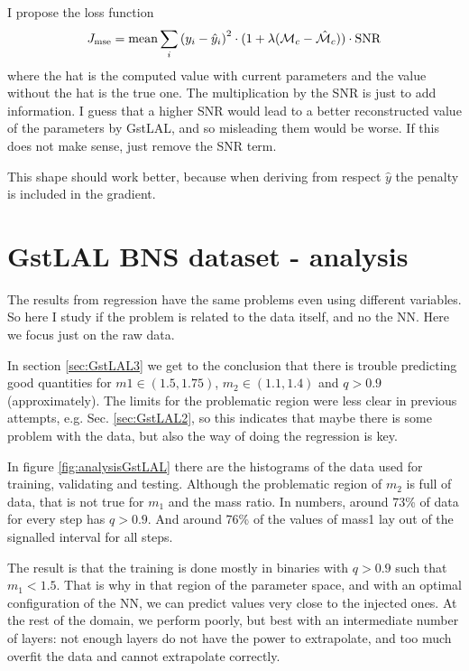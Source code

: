 \documentclass[prd,aps,twocolumn,a4paper,showkeys,nofootinbib]{article}
\begin{document}
I propose the loss function 
\begin{equation}
J_{\rm mse} = {\rm mean} \sum_i \left( y_i - \hat{y}_i \right)^2 \cdot(1+\lambda(\mathcal{M}_c-\hat{\mathcal{M}}_c))\cdot \rm{SNR}
\end{equation}
where the hat is the computed value with current parameters and the value without the hat is the true one. The multiplication by the SNR is just to add information. I guess that a higher SNR would lead to a better reconstructed value of the parameters by GstLAL, and so misleading them would be worse. If this does not make sense, just remove the SNR term.

This shape should work better, because when deriving from respect $\hat{y}$ the penalty is included in the gradient.



\section{GstLAL BNS dataset - analysis}
\label{sec:GstLALanalysis}
The results from regression have the same problems even using different variables. So here I study if the problem is related to the data itself, and no the NN. Here we focus just on the raw data.

In section \ref{sec:GstLAL3} we get to the conclusion that there is trouble predicting good quantities for $m1\in(1.5,1.75)$, $m_2\in(1.1,1.4)$ and $q>0.9$ (approximately). The limits for the problematic region were less clear in previous attempts, e.g. Sec. \ref{sec:GstLAL2}, so this indicates that maybe there is some problem with the data, but also the way of doing the regression is key.

In figure \ref{fig:analysisGstLAL} there are the histograms of the data used for training, validating and testing. Although the problematic region of $m_2$ is full of data, that is not true for $m_1$ and the mass ratio. In numbers, around 73\% of data for every step has $q>0.9$. And around 76\% of the values of mass1 lay out of the signalled interval for all steps. 

The result is that the training is done mostly in binaries with $q>0.9$ such that $m_1<1.5$. That is why in that region of the parameter space, and with an optimal configuration of the NN, we can predict values very close to the injected ones. At the rest of the domain, we perform poorly, but best with an intermediate number of layers: not enough layers do not have the power to extrapolate, and too much overfit the data and cannot extrapolate correctly.
\end{document}
